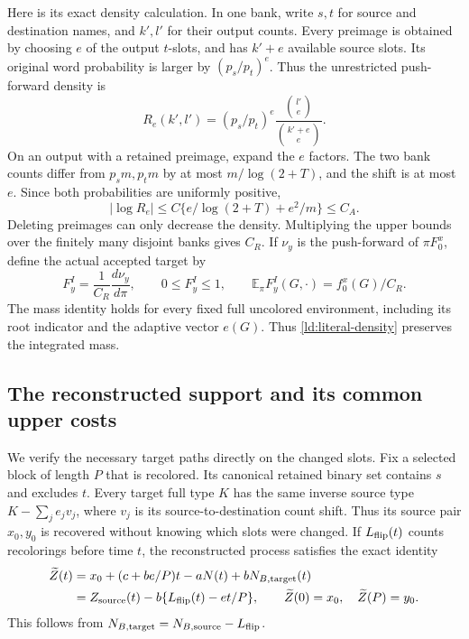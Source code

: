 Here is its exact density calculation.  In one bank, write \(s,t\)
for source and destination names, and \(k',l'\) for their output
counts.  Every preimage is obtained by choosing \(e\) of the
output \(t\)-slots, and has \(k'+e\) available source slots.
Its original word probability is larger by \((p_s/p_t)^e\).
Thus the unrestricted push-forward density is
\begin{equation}
 R_e(k',l')=(p_s/p_t)^e
       \frac{\binom{l'}e}{\binom{k'+e}e}.
 \label{ld:fine-RN}
\end{equation}
On an output with a retained preimage, expand the \(e\) factors.
The two bank counts differ from \(p_sm,p_tm\) by at most
\(m/\log(2+T)\), and the shift is at most \(e\).  Since both
probabilities are uniformly positive,
\begin{equation}
 |\log R_e|\le C\{e/\log(2+T)+e^2/m\}\le C_A.
 \label{ld:fine-RN-bound}
\end{equation}
Deleting preimages can only decrease the density.  Multiplying the
upper bounds over the finitely many disjoint banks gives \(C_R\).
If \(\nu_y\) is the push-forward of \(\pi F_0^x\), define
the actual accepted target by
\begin{equation}
 F_y^I=\frac1{C_R}\frac{d\nu_y}{d\pi},\qquad
 0\le F_y^I\le1,\qquad
 \mathbb E_\pi F_y^I(G,\cdot)=f_0^x(G)/C_R.
 \label{ld:literal-density}
\end{equation}
The mass identity holds for every fixed full uncolored environment,
including its root indicator and the adaptive vector \(e(G)\).
Thus \eqref{ld:literal-density} preserves the integrated mass.

\subsection{The reconstructed support and its common upper costs}

We verify the necessary target paths directly on the changed slots.
Fix a selected block of length \(P\) that is recolored.  Its
canonical retained binary set contains \(s\) and excludes \(t\).
Every target full type \(K\) has the same inverse source type
\(K-\sum_je_jv_j\), where \(v_j\) is its source-to-destination
count shift.  Thus its source pair \(x_0,y_0\) is recovered
without knowing which slots were changed.  If \(L_{\rm flip}(t)\)
counts recolorings before time \(t\), the reconstructed process
satisfies the exact identity
\begin{align}
 \widetilde Z(t)
  &=x_0+(c+be/P)t-aN(t)+bN_{B,\rm target}(t)\notag\\
  &=Z_{\rm source}(t)-b\{L_{\rm flip}(t)-et/P\},\qquad
 \widetilde Z(0)=x_0,\quad\widetilde Z(P)=y_0.
 \label{ld:slot-identity}
\end{align}
This follows from \(N_{B,\rm target}=N_{B,\rm source}
-L_{\rm flip}\).

